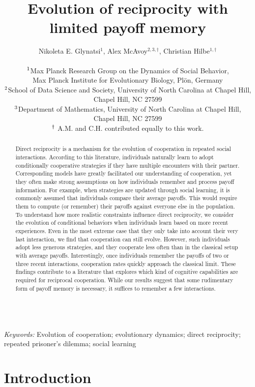 \documentclass[11pt]{article}
\title{\bf  \sffamily \Large Evolution of reciprocity %
with limited payoff memory\\}
\date{}
\author{\parbox[c]{16cm}{\centering \onehalfspacing 
Nikoleta E. Glynatsi$^1$,  Alex McAvoy$^{2,3, \dagger}$, Christian Hilbe$^{1, \dagger}$\\ \quad \\
$^{\rm 1}$Max Planck Research Group on the Dynamics of Social Behavior,\\ Max Planck Institute for Evolutionary Biology, Pl\"{o}n, Germany \\
$^{\rm 2}$School of Data Science and Society, University of North Carolina at Chapel Hill,\\ Chapel Hill, NC 27599 \\
$^{\rm 3}$Department of Mathematics, University of North Carolina at Chapel Hill,\\ Chapel Hill, NC 27599 \\
$^{\rm \dagger}$ A.M. and C.H. contributed equally to this work.}}
\theoremstyle{plainCl1}
\theoremstyle{plainCl2}
\begin{document}
\maketitle


\begin{abstract}
\noindent
Direct reciprocity is a mechanism for the evolution of cooperation in repeated social interactions.
According to this literature, individuals naturally learn to adopt conditionally cooperative strategies if they have multiple encounters with their partner.
Corresponding models have greatly facilitated our understanding of cooperation, yet they often make strong assumptions on how individuals remember and process payoff information.
For example, when strategies are updated through social learning, it is commonly assumed that individuals compare their average payoffs.
This would require them to compute (or remember) their payoffs against everyone else in the population.
To understand how more realistic constraints influence direct reciprocity, we consider the evolution of conditional behaviors when individuals learn based on more recent experiences.
Even in the most extreme case that they only take into account their very last interaction, we find that cooperation can still evolve.
However, such individuals adopt less generous strategies, and they cooperate less often than in the classical setup with average payoffs.
Interestingly, once individuals remember the payoffs of two or three recent interactions, cooperation rates quickly approach the classical limit.
These findings contribute to a literature that explores which kind of cognitive capabilities are required for reciprocal cooperation.
While our results suggest that some rudimentary form of payoff memory is necessary, it suffices to remember a few interactions.
\end{abstract}



~\\
{\it Keywords:} Evolution of cooperation; evolutionary dynamics; direct reciprocity; repeated prisoner's dilemma; social learning



\clearpage
\newpage



\section{Introduction}

\end{document}
